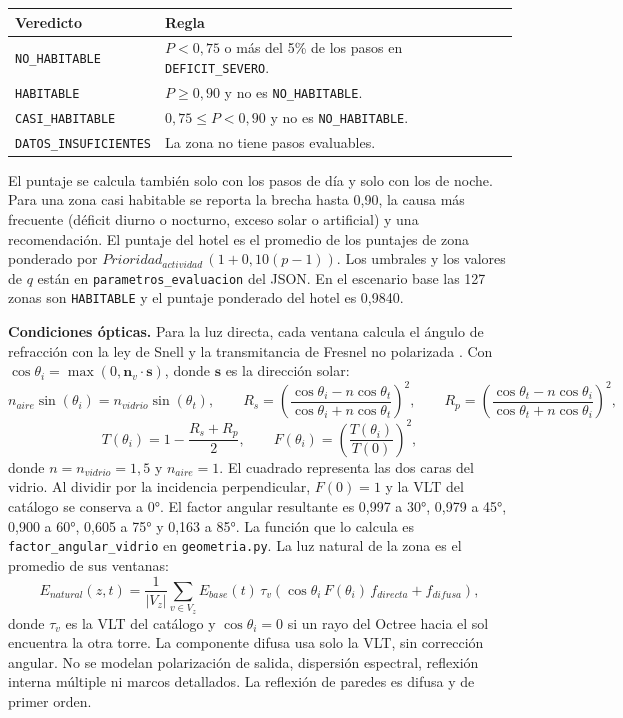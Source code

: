 \documentclass[12pt,a4paper]{article}
\newcommand{\estado}[1]{\texttt{#1}}
\newcommand{\codigo}[1]{\texttt{#1}}
\begin{document}
\begin{center}\small
\begin{tabular}{p{}p{}}
\toprule
\textbf{Veredicto} & \textbf{Regla}\\
\midrule
\estado{NO\_HABITABLE} & $P<0,75$ o más del 5\% de los pasos en \estado{DEFICIT\_SEVERO}.\\
\estado{HABITABLE} & $P\geq0,90$ y no es \estado{NO\_HABITABLE}.\\
\estado{CASI\_HABITABLE} & $0,75\leq P<0,90$ y no es \estado{NO\_HABITABLE}.\\
\estado{DATOS\_INSUFICIENTES} & La zona no tiene pasos evaluables.\\
\bottomrule
\end{tabular}
\end{center}

El puntaje se calcula también solo con los pasos de día y solo con los de noche. Para una zona casi habitable se reporta la brecha hasta 0,90, la causa más frecuente (déficit diurno o nocturno, exceso solar o artificial) y una recomendación. El puntaje del hotel es el promedio de los puntajes de zona ponderado por $Prioridad_{actividad}\,(1+0,10(p-1))$. Los umbrales y los valores de $q$ están en \codigo{parametros\_evaluacion} del JSON. En el escenario base las 127 zonas son \estado{HABITABLE} y el puntaje ponderado del hotel es 0,9840.

\textbf{Condiciones ópticas.} Para la luz directa, cada ventana calcula el ángulo de refracción con la ley de Snell y la transmitancia de Fresnel no polarizada \cite{edmundOptics}. Con $\cos\theta_i=\max(0,\mathbf n_v\cdot\mathbf s)$, donde $\mathbf s$ es la dirección solar:
\begin{equation}
 n_{aire}\sin(\theta_i)=n_{vidrio}\sin(\theta_t),\qquad
 R_s=\left(\frac{\cos\theta_i-n\cos\theta_t}{\cos\theta_i+n\cos\theta_t}\right)^2,\qquad
 R_p=\left(\frac{\cos\theta_t-n\cos\theta_i}{\cos\theta_t+n\cos\theta_i}\right)^2,
 \label{eq:snell}
\end{equation}
\begin{equation}
 T(\theta_i)=1-\frac{R_s+R_p}{2},\qquad
 F(\theta_i)=\left(\frac{T(\theta_i)}{T(0)}\right)^2,
 \label{eq:fresnel}
\end{equation}
donde $n=n_{vidrio}=1,5$ y $n_{aire}=1$. El cuadrado representa las dos caras del vidrio. Al dividir por la incidencia perpendicular, $F(0)=1$ y la VLT del catálogo se conserva a 0°. El factor angular resultante es 0,997 a 30°, 0,979 a 45°, 0,900 a 60°, 0,605 a 75° y 0,163 a 85°. La función que lo calcula es \codigo{factor\_angular\_vidrio} en \codigo{geometria.py}. La luz natural de la zona es el promedio de sus ventanas:
\begin{equation}
 E_{natural}(z,t)=\frac{1}{|V_z|}\sum_{v\in V_z}E_{base}(t)\,\tau_v\left(\cos\theta_i\,F(\theta_i)\,f_{directa}+f_{difusa}\right),
 \label{eq:natural}
\end{equation}
donde $\tau_v$ es la VLT del catálogo y $\cos\theta_i=0$ si un rayo del Octree hacia el sol encuentra la otra torre. La componente difusa usa solo la VLT, sin corrección angular. No se modelan polarización de salida, dispersión espectral, reflexión interna múltiple ni marcos detallados. La reflexión de paredes es difusa y de primer orden.
\end{document}
